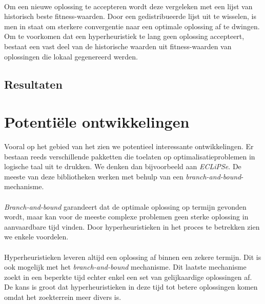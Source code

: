 \paragraph{}
Om een nieuwe oplossing te accepteren wordt deze vergeleken met een lijst van historisch beste fitness-waarden. Door een gedistribueerde lijst uit te wisselen, is men in staat om sterkere convergentie naar een optimale oplossing af te dwingen. Om te voorkomen dat een hyperheuristiek te lang geen oplossing accepteert, bestaat een vast deel van de historische waarden uit fitness-waarden van oplossingen die lokaal gegenereerd werden.

\subsection{Resultaten}

\section{Potenti\"ele ontwikkelingen}

Vooral op het gebied van het  zien we potentieel interessante ontwikkelingen. Er bestaan reeds verschillende pakketten die toelaten op optimalisatieproblemen in logische taal uit te drukken. We denken dan bijvoorbeeld aan \emph{ECLiPSe}. De meeste van deze bibliotheken werken met behulp van een \emph{branch-and-bound}-mechanisme.

\paragraph{}
\emph{Branch-and-bound} garandeert dat de optimale oplossing op termijn gevonden wordt, maar kan voor de meeste complexe problemen geen sterke oplossing in aanvaardbare tijd vinden. Door hyperheuristieken in het proces te betrekken zien we enkele voordelen.

\paragraph{}
Hyperheuristieken leveren altijd een oplossing af binnen een zekere termijn. Dit is ook mogelijk met het \emph{branch-and-bound} mechanisme. Dit laatste mechanisme zoekt in een beperkte tijd echter enkel een set van gelijkaardige oplossingen af. De kans is groot dat hyperheuristieken in deze tijd tot betere oplossingen komen omdat het zoekterrein meer divers is.

